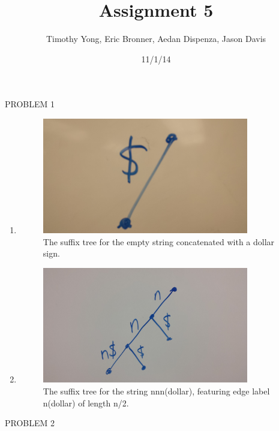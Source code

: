 \documentclass[a4paper]{article}
\title{Assignment 5}
\author{Timothy Yong, Eric Bronner, Aedan Dispenza, Jason Davis}
\date{11/1/14}
\begin{document}
\maketitle

\bigskip

\noindent PROBLEM 1

\begin{enumerate}

\item[] 

\begin{figure}[ht!]
\centering
\includegraphics[width=90mm]{suffix_tree_a.jpg}
\caption{The suffix tree for the empty string concatenated with a dollar sign.  \label{overflow}}
\end{figure}

\item[] 

\begin{figure}[ht!]
\centering
\includegraphics[width=90mm]{suffix_tree_b1.jpg}
\caption{The suffix tree for the string nnn(dollar), featuring edge label n(dollar) of length n/2.  \label{overflow}}
\end{figure}

\end{enumerate}

\bigskip
\bigskip

\noindent PROBLEM 2

\bigskip
\end{document}
